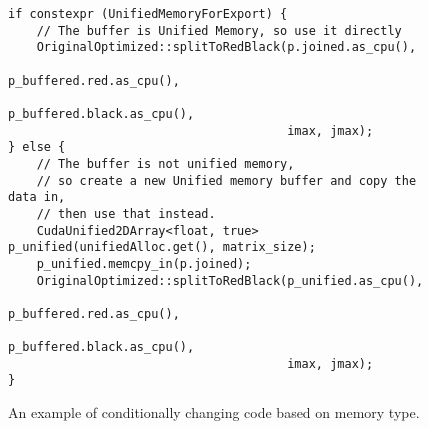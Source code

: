 \begin{figure}[ht]
    \centering
    \begin{lstlisting}
if constexpr (UnifiedMemoryForExport) {
    // The buffer is Unified Memory, so use it directly
    OriginalOptimized::splitToRedBlack(p.joined.as_cpu(),
                                       p_buffered.red.as_cpu(),
                                       p_buffered.black.as_cpu(),
                                       imax, jmax);
} else {
    // The buffer is not unified memory, 
    // so create a new Unified memory buffer and copy the data in,
    // then use that instead.
    CudaUnified2DArray<float, true> p_unified(unifiedAlloc.get(), matrix_size);
    p_unified.memcpy_in(p.joined);
    OriginalOptimized::splitToRedBlack(p_unified.as_cpu(),
                                       p_buffered.red.as_cpu(),
                                       p_buffered.black.as_cpu(),
                                       imax, jmax);
}\end{lstlisting}
    \caption{An example of conditionally changing code based on memory type.}
    \label{fig:TemplatedMemoryUsage}
\end{figure}